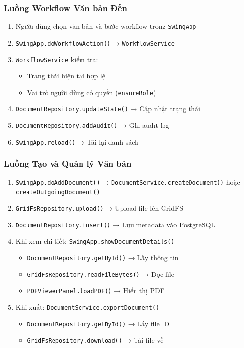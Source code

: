 \documentclass[12pt,a4paper]{article}
\begin{document}
\subsubsection{Luồng Workflow Văn bản Đến}
\begin{enumerate}
    \item Người dùng chọn văn bản và bước workflow trong \texttt{SwingApp}
    \item \texttt{SwingApp.doWorkflowAction()} → \texttt{WorkflowService}
    \item \texttt{WorkflowService} kiểm tra:
    \begin{itemize}
        \item Trạng thái hiện tại hợp lệ
        \item Vai trò người dùng có quyền (\texttt{ensureRole})
    \end{itemize}
    \item \texttt{DocumentRepository.updateState()} → Cập nhật trạng thái
    \item \texttt{DocumentRepository.addAudit()} → Ghi audit log
    \item \texttt{SwingApp.reload()} → Tải lại danh sách
\end{enumerate}

\subsubsection{Luồng Tạo và Quản lý Văn bản}
\begin{enumerate}
    \item \texttt{SwingApp.doAddDocument()} → \texttt{DocumentService.createDocument()} hoặc \texttt{createOutgoingDocument()}
    \item \texttt{GridFsRepository.upload()} → Upload file lên GridFS
    \item \texttt{DocumentRepository.insert()} → Lưu metadata vào PostgreSQL
    \item Khi xem chi tiết: \texttt{SwingApp.showDocumentDetails()}
    \begin{itemize}
        \item \texttt{DocumentRepository.getById()} → Lấy thông tin
        \item \texttt{GridFsRepository.readFileBytes()} → Đọc file
        \item \texttt{PDFViewerPanel.loadPDF()} → Hiển thị PDF
    \end{itemize}
    \item Khi xuất: \texttt{DocumentService.exportDocument()}
    \begin{itemize}
        \item \texttt{DocumentRepository.getById()} → Lấy file ID
        \item \texttt{GridFsRepository.download()} → Tải file về
    \end{itemize}
\end{enumerate}
\end{document}
